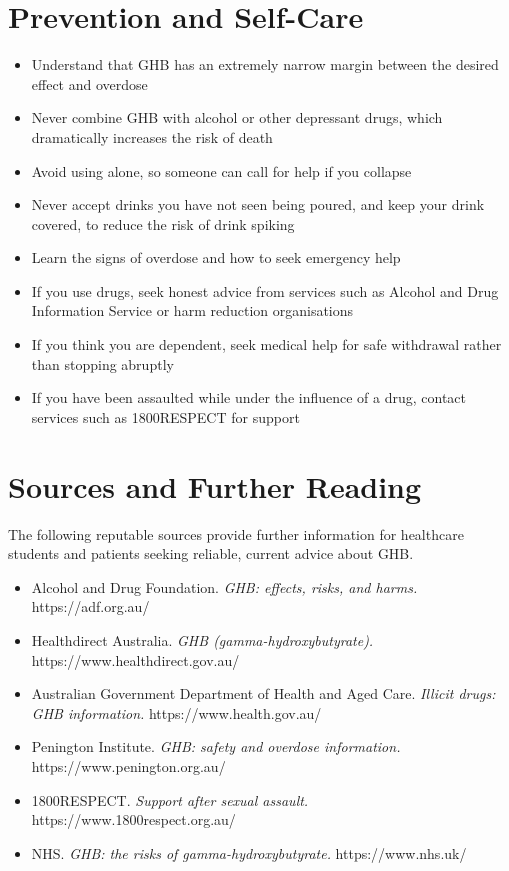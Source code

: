 \section*{Prevention and Self-Care}
\begin{itemize}
    \item Understand that GHB has an extremely narrow margin between the desired effect and overdose
    \item Never combine GHB with alcohol or other depressant drugs, which dramatically increases the risk of death
    \item Avoid using alone, so someone can call for help if you collapse
    \item Never accept drinks you have not seen being poured, and keep your drink covered, to reduce the risk of drink spiking
    \item Learn the signs of overdose and how to seek emergency help
    \item If you use drugs, seek honest advice from services such as Alcohol and Drug Information Service or harm reduction organisations
    \item If you think you are dependent, seek medical help for safe withdrawal rather than stopping abruptly
    \item If you have been assaulted while under the influence of a drug, contact services such as 1800RESPECT for support
\end{itemize}

\section*{Sources and Further Reading}
The following reputable sources provide further information for healthcare students and patients seeking reliable, current advice about GHB.

\begin{itemize}
    \item Alcohol and Drug Foundation. \textit{GHB: effects, risks, and harms.} https://adf.org.au/
    \item Healthdirect Australia. \textit{GHB (gamma-hydroxybutyrate).} https://www.healthdirect.gov.au/
    \item Australian Government Department of Health and Aged Care. \textit{Illicit drugs: GHB information.} https://www.health.gov.au/
    \item Penington Institute. \textit{GHB: safety and overdose information.} https://www.penington.org.au/
    \item 1800RESPECT. \textit{Support after sexual assault.} https://www.1800respect.org.au/
    \item NHS. \textit{GHB: the risks of gamma-hydroxybutyrate.} https://www.nhs.uk/
\end{itemize}
